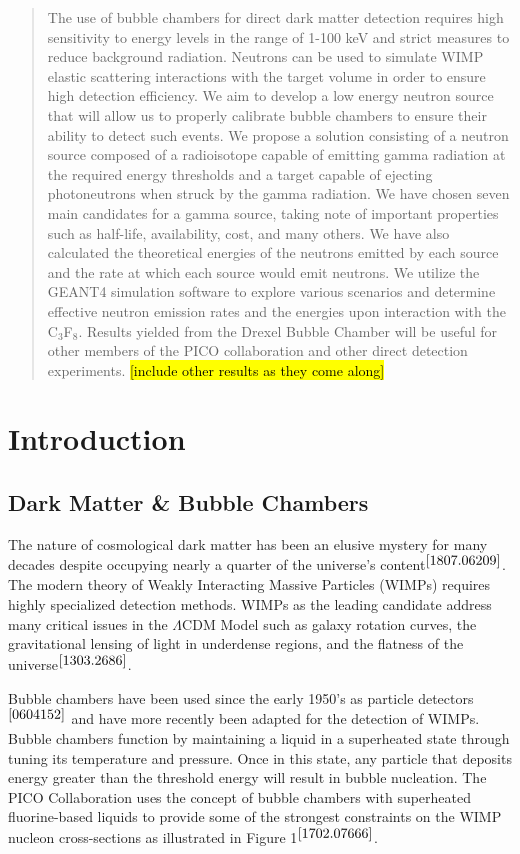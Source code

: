 \documentclass[%
12pt,
twoside,
reprint,
amsmath,amssymb,
aps,
]{article}
\begin{document}
	\begin{abstract}
	\doublespacing
	\par The use of bubble chambers for direct dark matter detection requires high sensitivity to energy levels in the range of 1-100 keV and strict measures to reduce background radiation. Neutrons can be used to simulate WIMP elastic scattering interactions with the target volume in order to ensure high detection efficiency. We aim to develop a low energy neutron source that will allow us to properly calibrate bubble chambers to ensure their ability to detect such events. We propose a solution consisting of a neutron source composed of a radioisotope capable of emitting gamma radiation at the required energy thresholds and a target capable of ejecting photoneutrons when struck by the gamma radiation. We have chosen seven main candidates for a gamma source, taking note of important properties such as half-life, availability, cost, and many others. We have also calculated the theoretical energies of the neutrons emitted by each source and the rate at which each source would emit neutrons. We utilize the GEANT4 simulation software to explore various scenarios and determine effective neutron emission rates and the energies upon interaction with the C$_{3}$F$_{8}$. Results yielded from the Drexel Bubble Chamber will be useful for other members of the PICO collaboration and other direct detection experiments. \hl{[include other results as they come along]}
	\end{abstract}
	
	\section{Introduction}
	\doublespacing
	\subsection{Dark Matter \& Bubble Chambers}
	\par The nature of cosmological dark matter has been an elusive mystery for many decades despite occupying nearly a quarter of the universe's content$^{\cite{1807.06209}}$. The modern theory of Weakly Interacting Massive Particles (WIMPs) requires highly specialized detection methods. WIMPs as the leading candidate address many critical issues in the $\Lambda$CDM Model such as galaxy rotation curves, the gravitational lensing of light in underdense regions, and the flatness of the universe$^{\cite{1303.2686}}$. 
	\par Bubble chambers have been used since the early 1950's as particle detectors$^{\cite{0604152}}$ and have more recently been adapted for the detection of WIMPs. Bubble chambers function by maintaining a liquid in a superheated state through tuning its temperature and pressure. Once in this state, any particle that deposits energy greater than the threshold energy will result in bubble nucleation. The PICO Collaboration uses the concept of bubble chambers with superheated fluorine-based liquids to provide some of the strongest constraints on the WIMP nucleon cross-sections as illustrated in Figure 1$^{\cite{1702.07666}}$.
	
\end{document}

